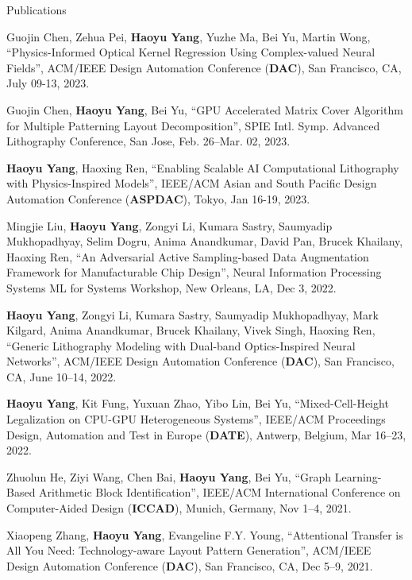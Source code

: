 \begin{rSection}{Publications}
\begin{description}[font=\normalfont]
	\item[{[C28]}] Guojin Chen, Zehua Pei, \textbf{Haoyu Yang}, Yuzhe Ma, Bei Yu, Martin Wong, ``Physics-Informed Optical Kernel Regression Using Complex-valued Neural Fields'', ACM/IEEE Design Automation Conference (\textbf{DAC}), San Francisco, CA, July 09-13, 2023.
	
		
	\item[{[C27]}] Guojin Chen, \textbf{Haoyu Yang}, Bei Yu, ``GPU Accelerated Matrix Cover Algorithm for Multiple Patterning Layout Decomposition'', SPIE Intl. Symp. Advanced Lithography Conference, San Jose, Feb. 26–Mar. 02, 2023.

	\item[{[C26]}] \textbf{Haoyu Yang}, Haoxing Ren, ``Enabling Scalable AI Computational Lithography with Physics-Inspired Models'', IEEE/ACM Asian and South Pacific Design Automation Conference (\textbf{ASPDAC}), Tokyo, Jan 16-19, 2023.
	
	\item[{[C25]}] Mingjie Liu, \textbf{Haoyu Yang}, Zongyi Li, Kumara Sastry, Saumyadip Mukhopadhyay, Selim Dogru, Anima Anandkumar, David Pan, Brucek Khailany, Haoxing Ren,
	``An Adversarial Active Sampling-based Data Augmentation Framework for Manufacturable Chip Design'',
	Neural Information Processing Systems ML for Systems Workshop, New Orleans, LA, Dec 3, 2022.
	
	\item[{[C24]}] \textbf{Haoyu Yang}, Zongyi Li, Kumara Sastry, Saumyadip Mukhopadhyay, Mark Kilgard, Anima Anandkumar, Brucek Khailany, Vivek Singh, Haoxing Ren,
	``Generic Lithography Modeling with Dual-band Optics-Inspired Neural Networks'',
	ACM/IEEE Design Automation Conference (\textbf{DAC}), San Francisco, CA, June 10–14, 2022.
	
	\item[{[C23]}] \textbf{Haoyu Yang}, Kit Fung, Yuxuan Zhao, Yibo Lin, Bei Yu,
	``Mixed-Cell-Height Legalization on CPU-GPU Heterogeneous Systems'',
	IEEE/ACM Proceedings Design, Automation and Test in Europe (\textbf{DATE}), Antwerp, Belgium, Mar 16–23, 2022.
	
	\item[{[C22]}] Zhuolun He, Ziyi Wang, Chen Bai, \textbf{Haoyu Yang}, Bei Yu, ``Graph Learning-Based Arithmetic Block Identification'',
	IEEE/ACM International Conference on Computer-Aided Design (\textbf{ICCAD}), Munich, Germany, Nov 1–4, 2021.
	
	\item[{[C21]}] Xiaopeng Zhang, \textbf{Haoyu Yang}, Evangeline F.Y. Young, ``Attentional Transfer is All You Need: Technology-aware Layout Pattern Generation'',
	ACM/IEEE Design Automation Conference (\textbf{DAC}), San Francisco, CA, Dec 5–9, 2021.
	

\end{description}
\end{rSection}
